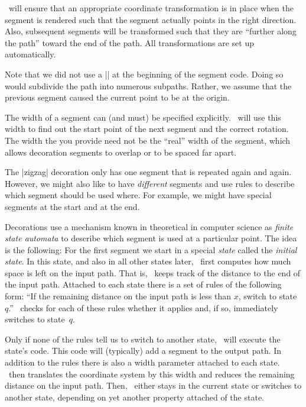 \pgfname\ will ensure that an appropriate coordinate transformation is in place
when the segment is rendered such that the segment actually points in the right
direction. Also, subsequent segments will be transformed such that they are
``further along the path'' toward the end of the path. All transformations are
set up automatically.

Note that we did not use a |\pgfpathmoveto{\pgfpointorigin}| at the beginning
of the segment code. Doing so would subdivide the path into numerous subpaths.
Rather, we assume that the previous segment caused the current point to be at
the origin.

The width of a segment can (and must) be specified explicitly. \pgfname\ will
use this width to find out the start point of the next segment and the correct
rotation. The width the you provide need not be the ``real'' width of the
segment, which allows decoration segments to overlap or to be spaced far apart.

The |zigzag| decoration only has one segment that is repeated again and again.
However, we might also like to have \emph{different} segments and use rules to
describe which segment should be used where. For example, we might have special
segments at the start and at the end.

Decorations use a mechanism known in theoretical in computer science as
\emph{finite state automata} to describe which segment is used at a particular
point. The idea is the following: For the first segment we start in a special
\emph{state} called the \emph{initial state}. In this state, and also in all
other states later, \pgfname\ first computes how much space is left on the
input path. That is, \pgfname\ keeps track of the distance to the end of the
input path. Attached to each state there is a set of rules of the following
form: ``If the remaining distance on the input path is less than $x$, switch to
state~$q$.'' \pgfname\ checks for each of these rules whether it applies and,
if so, immediately switches to state~$q$.

Only if none of the rules tell us to switch to another state, \pgfname\ will
execute the state's code. This code will (typically) add a segment to the
output path. In addition to the rules there is also a width parameter attached
to each state. \pgfname\ then translates the coordinate system by this width
and reduces the remaining distance on the input path. Then, \pgfname\ either
stays in the current state or switches to another state, depending on yet
another property attached of the state.


